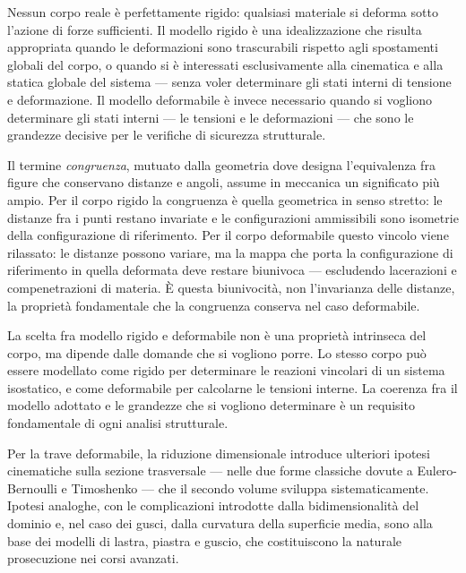 Nessun corpo reale è perfettamente rigido: qualsiasi materiale si deforma sotto l'azione di forze sufficienti. Il modello rigido è una idealizzazione che risulta appropriata quando le deformazioni sono trascurabili rispetto agli spostamenti globali del corpo, o quando si è interessati esclusivamente alla cinematica e alla statica globale del sistema --- senza voler determinare gli stati interni di tensione e deformazione. Il modello deformabile è invece necessario quando si vogliono determinare gli stati interni --- le tensioni e le deformazioni --- che sono le grandezze decisive per le verifiche di sicurezza strutturale.

\begin{oss}
	Il termine \textit{congruenza}, mutuato dalla geometria dove designa l'equivalenza fra figure che conservano distanze e angoli, assume in meccanica un significato più ampio. Per il corpo rigido la congruenza è quella geometrica in senso stretto: le distanze fra i punti restano invariate e le configurazioni ammissibili sono isometrie della configurazione di riferimento. Per il corpo deformabile questo vincolo viene rilassato: le distanze possono variare, ma la mappa che porta la configurazione di riferimento in quella deformata deve restare biunivoca --- escludendo lacerazioni e compenetrazioni di materia. È questa biunivocità, non l'invarianza delle distanze, la proprietà fondamentale che la congruenza conserva nel caso deformabile.
\end{oss}

\begin{oss}
	La scelta fra modello rigido e deformabile non è una proprietà intrinseca del corpo, ma dipende dalle domande che si vogliono porre. Lo stesso corpo può essere modellato come rigido per determinare le reazioni vincolari di un sistema isostatico, e come deformabile per calcolarne le tensioni interne. La coerenza fra il modello adottato e le grandezze che si vogliono determinare è un requisito fondamentale di ogni analisi strutturale.
\end{oss}

Per la trave deformabile, la riduzione dimensionale introduce ulteriori ipotesi cinematiche sulla sezione trasversale --- nelle due forme classiche dovute a Eulero-Bernoulli e Timoshenko --- che il secondo volume sviluppa sistematicamente. Ipotesi analoghe, con le complicazioni introdotte dalla bidimensionalità del dominio e, nel caso dei gusci, dalla curvatura della superficie media, sono alla base dei modelli di lastra, piastra e guscio, che costituiscono la naturale prosecuzione nei corsi avanzati.


